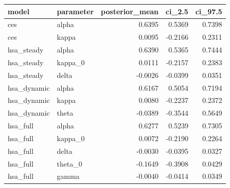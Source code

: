 \begin{tabular}{llrrr}
\toprule
model & parameter & posterior\_mean & ci\_2.5 & ci\_97.5 \\
\midrule
ces & alpha & 0.6395 & 0.5369 & 0.7398 \\
ces & kappa & 0.0095 & -0.2166 & 0.2311 \\
hsa\_steady & alpha & 0.6390 & 0.5365 & 0.7444 \\
hsa\_steady & kappa\_0 & 0.0111 & -0.2157 & 0.2383 \\
hsa\_steady & delta & -0.0026 & -0.0399 & 0.0351 \\
hsa\_dynamic & alpha & 0.6167 & 0.5054 & 0.7194 \\
hsa\_dynamic & kappa & 0.0080 & -0.2237 & 0.2372 \\
hsa\_dynamic & theta & -0.0389 & -0.3544 & 0.5649 \\
hsa\_full & alpha & 0.6277 & 0.5239 & 0.7305 \\
hsa\_full & kappa\_0 & 0.0072 & -0.2190 & 0.2264 \\
hsa\_full & delta & -0.0030 & -0.0395 & 0.0327 \\
hsa\_full & theta\_0 & -0.1649 & -0.3908 & 0.0429 \\
hsa\_full & gamma & -0.0040 & -0.0414 & 0.0349 \\
\bottomrule
\end{tabular}
